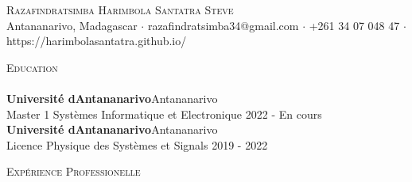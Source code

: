 \documentclass[a4paper]{article}
\newcommand{\lineunder} {
    \vspace*{-8pt} \\
    \hspace*{-18pt} \hrulefill \\
}
\newcommand{\header} [1] {
    {\hspace*{-18pt}\vspace*{6pt} \textsc{#1}}
    \vspace*{-6pt} \lineunder
}
\begin{document}
\vspace*{-40pt}

    

\vspace*{-10pt}
\begin{center}
	{\Huge \scshape {Razafindratsimba Harimbola Santatra Steve}}\\
	Antananarivo, Madagascar $\cdot$ razafindratsimba34@gmail.com $\cdot$ +261 34 07 048 47 $\cdot$ https://harimbolasantatra.github.io/\\
\end{center}

\header{Education}
\textbf{Université d\textquotesingle{}Antananarivo}\hfill Antananarivo\\
Master 1 Systèmes Informatique et Electronique \hfill 2022 - En cours\\
\vspace{2mm}
\textbf{Université d\textquotesingle{}Antananarivo}\hfill Antananarivo\\
Licence Physique des Systèmes et Signals \hfill 2019 - 2022\\
\vspace{2mm}

\header{Expérience Professionelle}
\vspace{1mm}
\end{document}
